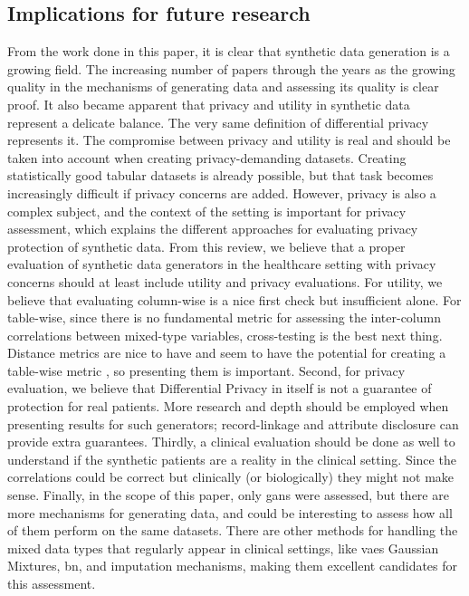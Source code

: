 


\subsection{Implications for future research}
From the work done in this paper, it is clear that synthetic data generation is a growing field. The increasing number of papers through the years as the growing quality in the mechanisms of generating data and assessing its quality is clear proof. 
It also became apparent that privacy and utility in synthetic data represent a delicate balance. The very same definition of differential privacy represents it. The compromise between privacy and utility is real and should be taken into account when creating privacy-demanding datasets.
Creating statistically good tabular datasets is already possible, but that task becomes increasingly difficult if privacy concerns are added. 
However, privacy is also a complex subject, and the context of the setting is important for privacy assessment, which explains the different approaches for evaluating privacy protection of synthetic data.
From this review, we believe that a proper evaluation of synthetic data generators in the healthcare setting with privacy concerns should at least include utility and privacy evaluations. For utility, we believe that evaluating column-wise is a nice first check but insufficient alone.
For table-wise, since there is no fundamental metric for assessing the inter-column correlations between mixed-type variables, cross-testing is the best next thing. Distance metrics are nice to have and seem to have the potential for creating a table-wise metric \cite{metrics}, so presenting them is important. Second, for privacy evaluation, we believe that Differential Privacy in itself is not a guarantee of protection for real patients. More research and depth should be employed when presenting results for such generators; record-linkage and attribute disclosure can provide extra guarantees.
Thirdly, a clinical evaluation should be done as well to understand if the synthetic patients are a reality in the clinical setting. Since the correlations could be correct but clinically (or biologically) they might not make sense. Finally, in the scope of this paper, only \acp{gan} were assessed, but there are more mechanisms for generating data, and could be interesting to assess how all of them perform on the same datasets. There are other methods for handling the mixed data types that regularly appear in clinical settings, like \acp{vae} Gaussian Mixtures, \ac{bn}, and imputation mechanisms, making them excellent candidates for this assessment.



